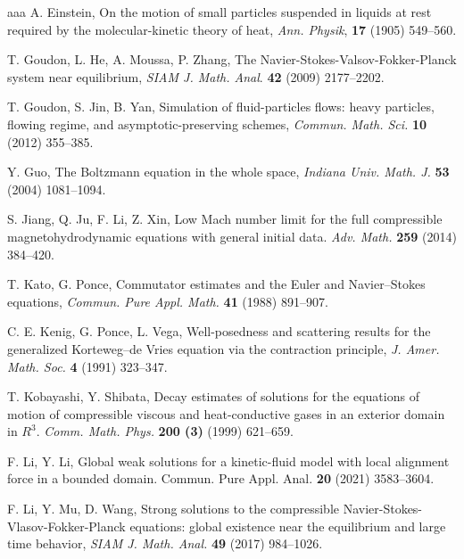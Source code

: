 \documentclass[reqno,11pt]{amsart}
\theoremstyle{plain}
\numberwithin{equation}{section}
\begin{document}
\begin{thebibliography}{aaa}
A. Einstein, On the motion of small particles suspended in liquids at rest required by the
molecular-kinetic theory of heat, {\it Ann. Physik}, {\bf 17} (1905) 549--560.


 T. Goudon, L. He, A. Moussa, P. Zhang, The Navier-Stokes-Valsov-Fokker-Planck  
system near equilibrium, {\it SIAM J. Math. Anal}. {\bf 42} (2009) 2177--2202.

 T. Goudon, S. Jin, B. Yan, 
Simulation of fluid-particles flows: heavy particles, flowing regime, 
and asymptotic-preserving schemes, {\it Commun. Math. Sci.} {\bf 10} (2012) 355--385.


 Y. Guo, The Boltzmann equation in the whole space,
 {\it Indiana Univ. Math. J.} {\bf 53} (2004) 1081--1094.


S. Jiang, Q. Ju, F.  Li, Z.  Xin,   Low Mach number limit for the full compressible magnetohydrodynamic equations with general initial data.  {\it Adv. Math.}  {\bf 259} (2014)  384--420.

 T. Kato, G. Ponce,  Commutator estimates and the Euler and 
Navier–Stokes equations,  {\it Commun. Pure Appl. Math.} {\bf 41} (1988) 891--907.


 C. E. Kenig, G. Ponce, L. Vega, Well-posedness and scattering 
results for the generalized Korteweg–de Vries equation via the contraction principle,
 {\it J. Amer. Math. Soc.} {\bf 4} (1991) 323--347.

  T. Kobayashi, Y.  Shibata,   Decay estimates of solutions for the equations of motion of compressible viscous and heat-conductive gases in an exterior domain in $R^3$. {\it Comm. Math. Phys. }
    {\bf 200 (3) } (1999)    621--659.  
 

 F. Li, Y.  Li,   Global weak solutions for a kinetic-fluid model
 with local alignment force in a bounded domain. Commun. Pure Appl. Anal. \textbf{20} (2021) 3583--3604.  

 F. Li, Y. Mu, D. Wang, 
Strong solutions to the compressible Navier-Stokes-Vlasov-Fokker-Planck equations: 
global existence near the equilibrium and large time behavior,
{\it SIAM J. Math. Anal.}   {\bf 49} (2017) 984--1026.


\end{thebibliography}
\end{document}
